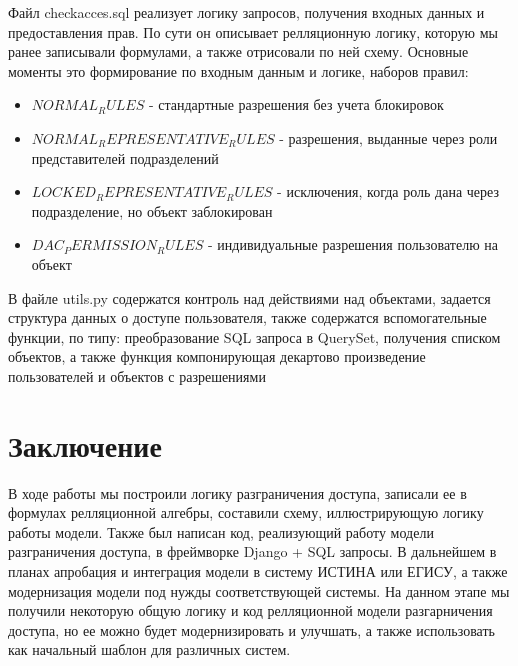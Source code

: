 \documentclass[14pt, a4paper]{extarticle}
\begin{document}


Файл checkacces.sql реализует логику запросов, получения входных данных и предоставления прав.
По сути он описывает релляционную логику, которую мы ранее записывали формулами, а также отрисовали по ней схему.
Основные моменты это формирование по входным данным и логике, наборов правил:
\begin{itemize}
    \item $NORMAL_RULES$ - стандартные разрешения без учета блокировок
    \item $NORMAL_REPRESENTATIVE_RULES$ - разрешения, выданные через роли представителей подразделений
    \item $LOCKED_REPRESENTATIVE_RULES$ - исключения, когда роль дана через подразделение, но объект заблокирован
    \item $DAC_PERMISSION_RULES$ - индивидуальные  разрешения пользователю на объект
\end{itemize}



В файле utils.py содержатся контроль над действиями над объектами, задается структура данных о доступе пользователя, также содержатся вспомогательные функции,
по типу: преобразование SQL запроса в QuerySet, получения списком объектов, а также функция компонирующая декартово произведение пользователей и объектов с разрешениями







\clearpage
\section*{Заключение}
В ходе работы мы построили логику разграничения доступа, записали ее в формулах релляционной алгебры, составили схему, иллюстрирующую логику работы модели.
Также был написан код, реализующий работу модели разграничения доступа, в фреймворке Django + SQL запросы. В дальнейшем в планах апробация и интеграция модели в систему ИСТИНА или ЕГИСУ, а также
модернизация модели под нужды соответствующей системы. На данном этапе мы получили некоторую общую логику и код релляционной модели разгарничения доступа, но ее можно будет модернизировать и улучшать, а также использовать как начальный шаблон для различных систем.

\newpage
\printbibliography[heading=bibintoc,title={Список литературы}]
\end{document}
